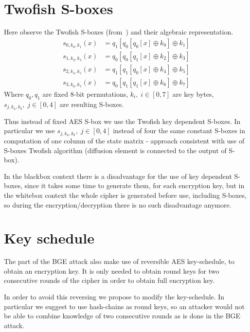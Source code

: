 \documentclass[11pt,oneside,final]{fithesis2}
\begin{document}
    \section{Twofish S-boxes}\label{sec:twofish_sbox}
    Here observe the Twofish S-boxes (from~\citep{Schneier98twofish:a}) and their algebraic representation.
    \begin{subequations}\label{eq:twofish_sbox}
    \begin{align}
	s_{0,k_0,k_1}\left(x\right) &= q_1\left[q_0\left[q_0\left[x\right] \oplus k_0 \right] \oplus k_1 \right]\\
	s_{1,k_2,k_3}\left(x\right) &= q_0\left[q_0\left[q_1\left[x\right] \oplus k_2 \right] \oplus k_3 \right]\\
	s_{2,k_4,k_5}\left(x\right) &= q_1\left[q_1\left[q_0\left[x\right] \oplus k_4 \right] \oplus k_5 \right]\\
	s_{3,k_6,k_7}\left(x\right) &= q_0\left[q_1\left[q_1\left[x\right] \oplus k_6 \right] \oplus k_7 \right]
    \end{align}
    \end{subequations}
    Where $q_0, q_1$ are fixed 8-bit permutations, $k_i,\; i \in [0,7]$ are key bytes, $s_{j,k_a,k_b},\; j \in [0,4]$ are resulting S-boxes.

    Thus instead of fixed AES S-box we use the Twofish key dependent S-boxes. In particular we use $s_{j,k_a,k_b},\; j \in [0,4]$ instead of four the same constant
    S-boxes in computation of one column of the state matrix - approach consistent with use of S-boxes Twofish algorithm (diffusion element is connected 
    to the output of S-box). 

    In the blackbox context there is a disadvantage for the use of key dependent S-boxes, since it takes some time to generate them, for each encryption key, but in the whitebox context
    the whole cipher is generated before use, including S-boxes, so during the encryption/decryption there is no such disadvantage anymore.
   
    \section{Key schedule}
    The part of the BGE attack also make use of reversible AES key-schedule, to obtain an encryption key. It is only needed to obtain round keys for two consecutive
    rounds of the cipher in order to obtain full encryption key.

    In order to avoid this reversing we propose to modify the key-schedule.
    In particular we suggest to use hash-chains as round keys, so an attacker would not be able to combine knowledge of two consecutive rounds as is done in the BGE attack.
    
\end{document}
